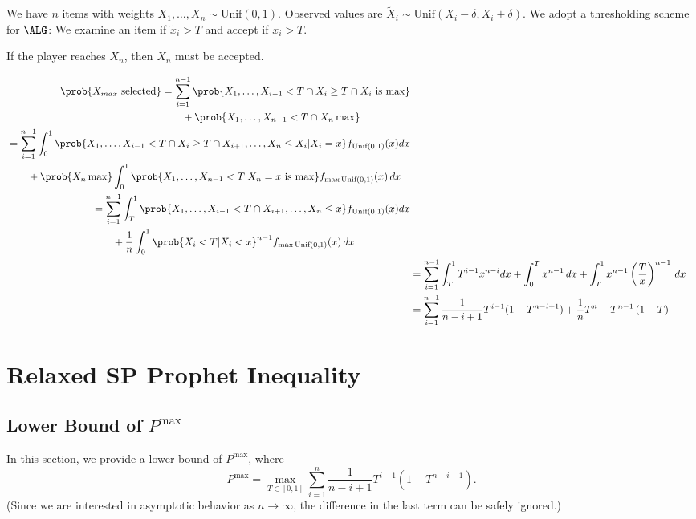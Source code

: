 We have $n$ items with weights $X_1, \dots, X_n \sim \text{Unif}(0,1)$.
Observed values are $\tilde X_i \sim \text{Unif}(X_i  - \delta, X_i + \delta)$.
We adopt a thresholding scheme for $\ALG$: We examine an item if $\tilde x_i > T$ and accept if $x_i > T$.

{\color{red}If the player reaches $X_n$, then $X_n$ must be accepted.}

\begin{align*}
\begin{split}
\prob{X_{max} \text{ selected}} &=\sum_{i=1}^{ n -1}\prob{X_1, \dots, X_{i-1}<T \cap X_i \geq T \cap X_i \text{ is max}} \\
				&\qquad + \prob{X_1, \ldots, X_{n-1} < T \cap X_n \max}
\end{split} 
\\
\begin{split}
&=\sum_{i=1}^{ n -1}\int_0^1 \prob{X_1,\dots,X_{i-1}<T\cap X_i\geq T \cap X_{i+1},\dots,X_{n}\leq X_i | X_i = x} f_{\text{Unif}(0,1)}(x) dx \\
&\qquad + \prob{X_n \max} \int_0^1 \prob{X_1, \ldots, X_{n-1} < T | X_n = x \text{ is max}} f_{\max \text{Unif}(0,1)}(x) \,dx
\end{split}
\\
\begin{split}
&=\sum_{i=1}^{ n -1}\int_T^1 \prob{X_1,\dots,X_{i-1}<T \cap X_{i+1},\dots,X_n\leq x} f_{\text{Unif}(0,1)}(x) dx \\
&\qquad +\frac{1}{n} \int_0^1 \prob{X_i<T | X_i<x}^{n-1} f_{\max \text{Unif(0,1)}}(x) \,dx
\end{split}
\\
&=\sum_{i=1}^{ n -1}\int_T^1 T^{i-1} x^{n-i} dx + \int_0^T x^{n-1}\,dx + \int_T^1 x^{n-1} \left( \frac{T}{x} \right)^{n-1} \,dx
\\
&=\sum_{i=1}^{ n -1}\frac{1}{n-i+1} T^{i-1}(1-T^{n-i+1}) + \frac{1}{n}T^n + T^{n-1} \left( 1-T \right) 
\end{align*}
\section{Relaxed SP Prophet Inequality}
\subsection{Lower Bound of $P^{\text{max}}$}

In this section, we provide a lower bound of $P^{\text{max}}$, where
\[
P^{\text{max}} = \max_{T \in [0,1]}\sum_{i=1}^n\frac{1}{n-i+1} T^{i-1}(1-T^{n-i+1}).
\]
(Since we are interested in asymptotic behavior as $n \to \infty$, the difference in the last term can be safely ignored.)

